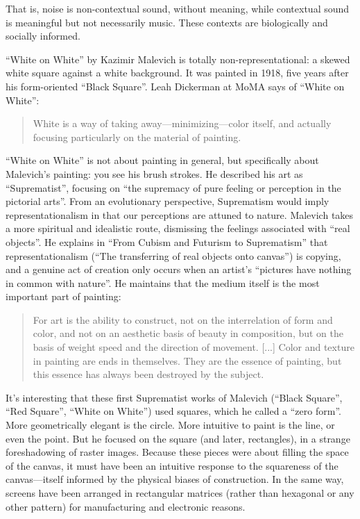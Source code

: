 \documentclass{thesis}
\begin{document}
That is, noise is non-contextual sound, without meaning, while contextual sound is meaningful but not necessarily music. These contexts are biologically and socially informed.


	``White on White'' by Kazimir Malevich is totally non-representational: a skewed white square against a white background. It was painted in 1918, five years after his form-oriented ``Black Square''. Leah Dickerman at MoMA says of ``White on White''\cite{moma_kazimir_2006}:
	
	\begin{quote}
	White is a way of taking away---minimizing---color itself, and actually focusing particularly on the material of painting.
	\end{quote}
	
	``White on White'' is not about painting in general, but specifically about Malevich's painting: you see his brush strokes. He described his art as ``Suprematist'', focusing on ``the supremacy of pure feeling or perception in the pictorial arts''. From an evolutionary perspective, Suprematism would imply representationalism in that our perceptions are attuned to nature. Malevich takes a more spiritual and idealistic route, dismissing the feelings associated with ``real objects''. He explains in ``From Cubism and Futurism to Suprematism'' that representationalism (``The transferring of real objects onto canvas'') is copying, and a genuine act of creation only occurs when an artist's ``pictures have nothing in common with nature''. He maintains that the medium itself is the most important part of painting:
	
	\begin{quote}
	For art is the ability to construct, not on the interrelation of form and color, and not on an aesthetic basis of beauty in composition, but on the basis of weight speed and the direction of movement. [...] Color and texture in painting are ends in themselves. They are the essence of painting, but this essence has always been destroyed by the subject.
	\end{quote}
	
	It's interesting that these first Suprematist works of Malevich (``Black Square'', ``Red Square'', ``White on White'') used squares, which he called a ``zero form''. More geometrically elegant is the circle. More intuitive to paint is the line, or even the point. But he focused on the square (and later, rectangles), in a strange foreshadowing of raster images. Because these pieces were about filling the space of the canvas, it must have been an intuitive response to the squareness of the canvas---itself informed by the physical biases of construction. In the same way, screens have been arranged in rectangular matrices (rather than hexagonal or any other pattern) for manufacturing and electronic reasons.
	
\end{document}

